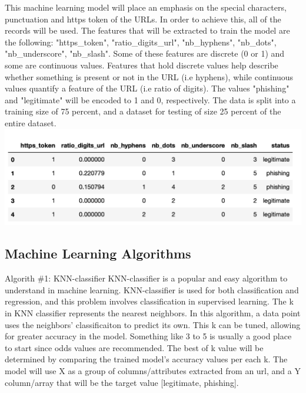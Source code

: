 \documentclass[conference]{IEEEtran}
\begin{document}
This machine learning model will place an emphasis on the special characters, punctuation and https token of the URLs. In order to achieve this, all of the records will be used. The features that will be extracted to train the model are the following: "https_token", "ratio_digits_url", "nb_hyphens", "nb_dots", "nb_underscore", "nb_slash". Some of these features are discrete (0 or 1) and some are continuous values. Features that hold discrete values help describe whether something is present or not in the URL (i.e hyphens), while continuous values quantify a feature of the URL (i.e ratio of digits). The values "phishing" and "legitimate" will be encoded to 1 and 0, respectively. The data is split into a training size of 75 percent, and a dataset for testing of size 25 percent of the entire dataset.  
\includegraphics{dataset.png}

\subsection{Machine Learning Algorithms}
Algorith \#1: KNN-classifier
KNN-classifier is a popular and easy algorithm to understand in machine learning. KNN-classifier is used for both classification and regression, and this problem involves classification in supervised learning. The k in KNN classifier represents the nearest neighbors. In this algorithm, a data point uses the neighbors' classificaiton to predict its own. This k can be tuned, allowing for greater accuracy in the model. Something like 3 to 5 is usually a good place to start since odds values are recommended. The best of k value will be determined by comparing the trained model's accuracy values per each k. The model will use X as a group of columns/attributes extracted from an url, and a Y column/array that will be the target value [legitimate, phishing].
\end{document}
